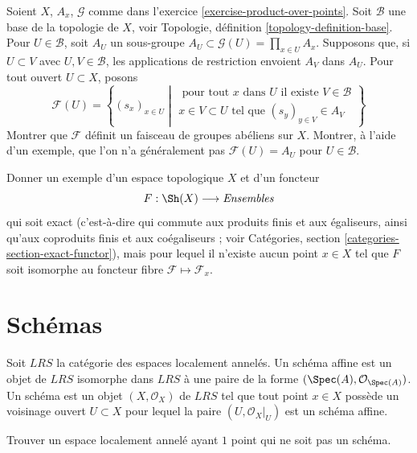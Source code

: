 \begin{exercise}
\label{exercise-modified-product-over-points}
Soient $X$, $A_x$, $\mathcal{G}$ comme dans
l'exercice \ref{exercise-product-over-points}.
Soit $\mathcal{B}$ une base de la topologie de $X$, voir
Topologie, définition \ref{topology-definition-base}.
Pour $U \in \mathcal{B}$, soit $A_U$ un sous-groupe
$A_U \subset \mathcal{G}(U) = \prod_{x \in U} A_x$. Supposons que, si
$U \subset V$ avec $U, V \in \mathcal{B}$, les applications de restriction
envoient $A_V$ dans $A_U$. Pour tout ouvert $U \subset X$, posons
$$
\mathcal{F}(U) =
\left\{
(s_x)_{x \in U}
\middle|
\begin{matrix}
\text{ pour tout }x\text{ dans }U\text{ il existe } V \in \mathcal{B} \\
x \in V \subset U\text{ tel que } (s_y)_{y \in V} \in A_V
\end{matrix}
\right\}
$$
Montrer que $\mathcal{F}$ définit un faisceau de groupes abéliens sur $X$.
Montrer, à l'aide d'un exemple, que l'on n'a généralement pas
$\mathcal{F}(U) = A_U$ pour $U \in \mathcal{B}$.
\end{exercise}

\begin{exercise}
\label{exercise-exact-but-not-a-stalk-functor}
Donner un exemple d'un espace topologique $X$ et d'un foncteur
$$
F : \Sh(X) \longrightarrow \textit{Ensembles}
$$
qui soit exact (c'est-à-dire qui commute aux produits finis et aux égaliseurs, ainsi
qu'aux coproduits finis et aux coégaliseurs ; voir Catégories, section
\ref{categories-section-exact-functor}), mais pour lequel il n'existe aucun point $x \in X$
tel que $F$ soit isomorphe au foncteur fibre
$\mathcal{F} \mapsto \mathcal{F}_x$.
\end{exercise}




\section{Schémas}
\label{section-schemes}

\noindent
Soit $LRS$ la catégorie des espaces localement annelés.
Un schéma affine est un objet de $LRS$ isomorphe dans $LRS$ à
une paire de la forme $(\Spec(A), {\mathcal O}_{\Spec(A)})$.
Un schéma est un
objet $(X, {\mathcal O}_X)$ de $LRS$ tel que tout point $x\in X$
possède un voisinage ouvert $U \subset X$ pour lequel la paire
$(U, {\mathcal O}_X|_U)$ est un schéma affine.

\begin{exercise}
\label{exercise-one-point}
Trouver un espace localement annelé ayant $1$ point qui ne soit pas un schéma.
\end{exercise}


